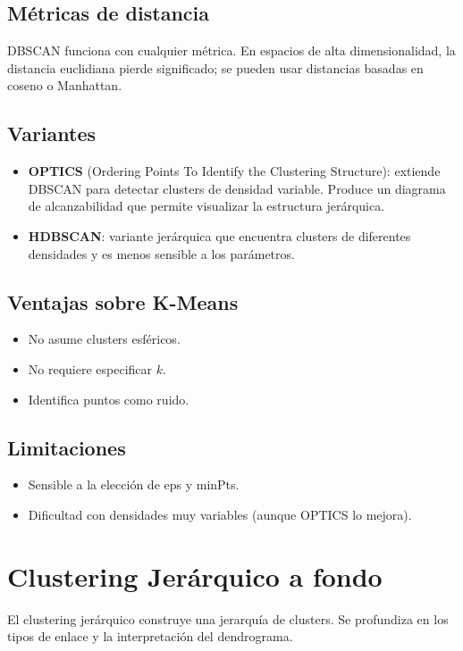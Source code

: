 \documentclass[12pt,a4paper,openany,oneside]{book}
\begin{document}
\subsection{Métricas de distancia}
DBSCAN funciona con cualquier métrica. En espacios de alta dimensionalidad, la distancia euclidiana pierde significado; se pueden usar distancias basadas en coseno o Manhattan.

\subsection{Variantes}
\begin{itemize}
    \item \textbf{OPTICS} (Ordering Points To Identify the Clustering Structure): extiende DBSCAN para detectar clusters de densidad variable. Produce un diagrama de alcanzabilidad que permite visualizar la estructura jerárquica.
    \item \textbf{HDBSCAN}: variante jerárquica que encuentra clusters de diferentes densidades y es menos sensible a los parámetros.
\end{itemize}

\subsection{Ventajas sobre K-Means}
\begin{itemize}
    \item No asume clusters esféricos.
    \item No requiere especificar \(k\).
    \item Identifica puntos como ruido.
\end{itemize}

\subsection{Limitaciones}
\begin{itemize}
    \item Sensible a la elección de eps y minPts.
    \item Dificultad con densidades muy variables (aunque OPTICS lo mejora).
\end{itemize}

\section{Clustering Jerárquico a fondo}

El clustering jerárquico construye una jerarquía de clusters. Se profundiza en los tipos de enlace y la interpretación del dendrograma.
\end{document}
